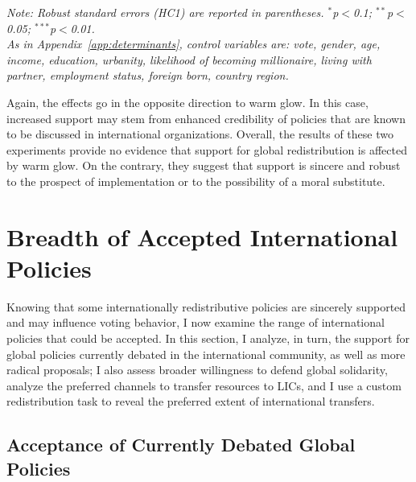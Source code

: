 \documentclass[12pt,english]{article}
\begin{document}
\begin{bibunit}
\begin{table}[!htbp] 
  \caption[Effect on support for global redistribution of believing that it is likely]{Effect on support for global redistribution of believing that it is likely.}\label{tab:iv} 
  \makebox[\textwidth][c]{} %
  \textit{Note: Robust standard errors (HC1) are reported in parentheses. \hfill %
  $^{*}$p$<$0.1; $^{**}$p$<$0.05; $^{***}$p$<$0.01. \\ %
  As in Appendix~\ref{app:determinants}, control variables are: vote, gender, age, income, education, urbanity, likelihood of becoming millionaire, living with partner, employment status, foreign born, country region.}
\end{table}

Again, the effects go in the opposite direction to warm glow. In this case, increased support may stem from enhanced credibility of policies that are known to be discussed in international organizations. 
Overall, the results of these two experiments provide no evidence that support for global redistribution is affected by warm glow. On the contrary, they suggest that support is sincere and robust to the prospect of implementation or to the possibility of a moral substitute.


\section{Breadth of Accepted International Policies\label{sec:breadth}}

Knowing that some internationally redistributive policies are sincerely supported and may influence voting behavior, I now examine the range of international policies that could be accepted. In this section, I analyze, in turn, the support for global policies currently debated in the international community, as well as more radical proposals; I also assess broader willingness to defend global solidarity, analyze the preferred channels to transfer resources to LICs, and I use a custom redistribution task to reveal the preferred extent of international transfers. 

\subsection{Acceptance of Currently Debated Global Policies}\label{subsec:debated}


\end{bibunit}
\end{document}
